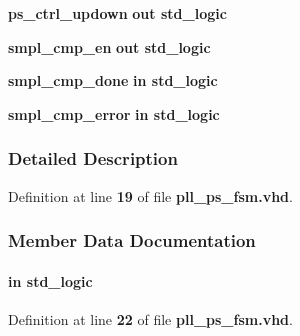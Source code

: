\begin{DoxyCompactItemize}
\item 
{\bf ps\+\_\+ctrl\+\_\+updown}  {\bfseries {\bfseries \textcolor{keywordflow}{out}\textcolor{vhdlchar}{ }}} {\bfseries \textcolor{comment}{std\+\_\+logic}\textcolor{vhdlchar}{ }} 
\item 
{\bf smpl\+\_\+cmp\+\_\+en}  {\bfseries {\bfseries \textcolor{keywordflow}{out}\textcolor{vhdlchar}{ }}} {\bfseries \textcolor{comment}{std\+\_\+logic}\textcolor{vhdlchar}{ }} 
\item 
{\bf smpl\+\_\+cmp\+\_\+done}  {\bfseries {\bfseries \textcolor{keywordflow}{in}\textcolor{vhdlchar}{ }}} {\bfseries \textcolor{comment}{std\+\_\+logic}\textcolor{vhdlchar}{ }} 
\item 
{\bf smpl\+\_\+cmp\+\_\+error}  {\bfseries {\bfseries \textcolor{keywordflow}{in}\textcolor{vhdlchar}{ }}} {\bfseries \textcolor{comment}{std\+\_\+logic}\textcolor{vhdlchar}{ }} 
\end{DoxyCompactItemize}


\subsubsection{Detailed Description}


Definition at line {\bf 19} of file {\bf pll\+\_\+ps\+\_\+fsm.\+vhd}.



\subsubsection{Member Data Documentation}
\paragraph[{clk}]{ {\bfseries \textcolor{keywordflow}{in}\textcolor{vhdlchar}{ }} {\bfseries \textcolor{comment}{std\+\_\+logic}\textcolor{vhdlchar}{ }} \hspace{0.3cm}{\ttfamily [Port]}}\label{classpll__ps__fsm_a4a4609c199d30b3adebbeb3a01276ec5}


Definition at line {\bf 22} of file {\bf pll\+\_\+ps\+\_\+fsm.\+vhd}.

\paragraph[{ieee}]{\hspace{0.3cm}{\ttfamily [Library]}}\label{classpll__ps__fsm_a0a6af6eef40212dbaf130d57ce711256}


